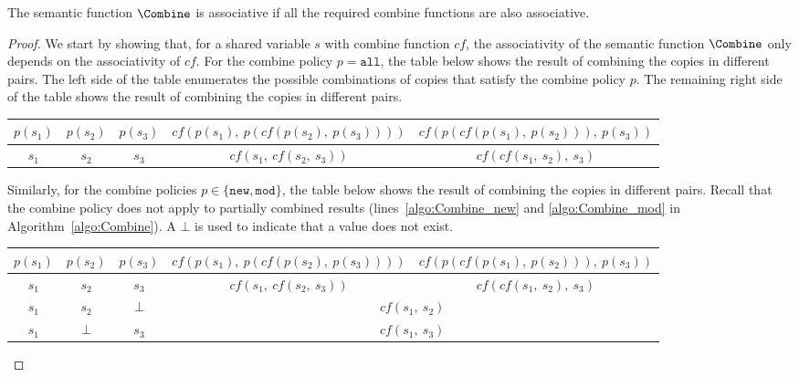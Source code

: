 \begin{theorem}
	\label{thm:associative_combine}
	The semantic function $\Combine$ is associative if all the 
	required combine functions are also associative.
\end{theorem}
\begin{proof}
	We start by showing that, for a shared variable $s$ with 
	combine function $cf$, the associativity of the semantic function 
	$\Combine$ only depends on the associativity of $cf$. For the 
	combine policy $p = \mathtt{all}$, the table below shows the 
	result of combining the copies in different pairs. The 
	left side of the table enumerates the possible combinations of 
	copies that satisfy the combine policy $p$. The remaining right 
	side of the table shows the result of combining the copies in
	different pairs.
	\begin{center}
		\begin{tabular}{| c c c || c | c |}
			\hline
			\boldmath$p(s_1)$	& \boldmath$p(s_2)$	&\boldmath$p(s_3)$	& \boldmath$cf(p(s_1),~p(cf(p(s_2),~p(s_3))))$	& \boldmath$cf(p(cf(p(s_1),~p(s_2))),~p(s_3))$	\\ 
			\hline
			$s_1$				& $s_2$				& $s_3$				& $cf(s_1,~cf(s_2,~s_3))$						& $cf(cf(s_1,~s_2),~s_3)$						\\
			\hline
		\end{tabular}
	\end{center}
	Similarly, for the combine policies $p \in \{\mathtt{new}, \mathtt{mod}\}$, the 
	table below shows the result of combining the copies in 
	different pairs. Recall that the combine policy does not apply to 
	partially combined results (lines~\ref{algo:Combine_new} and 
	\ref{algo:Combine_mod} in Algorithm~\ref{algo:Combine}). 
	A $\bot$ is used to indicate that a value does not exist.
	\begin{center}
		\begin{tabular}{| c c c || c | c |}
			\hline
			\boldmath$p(s_1)$	& \boldmath$p(s_2)$	&\boldmath$p(s_3)$	& \boldmath$cf(p(s_1),~p(cf(p(s_2),~p(s_3))))$	& \boldmath$cf(p(cf(p(s_1),~p(s_2))),~p(s_3))$	\\ 
			\hline
			$s_1$				& $s_2$				& $s_3$				& $cf(s_1,~cf(s_2,~s_3))$						& $cf(cf(s_1,~s_2),~s_3)$						\\ \hline
			$s_1$				& $s_2$				& $\bot$			& \multicolumn{2}{c|}{$cf(s_1,~s_2)$}															\\ \hline
			$s_1$				& $\bot$			& $s_3$				& \multicolumn{2}{c|}{$cf(s_1,~s_3)$}															\\ \hline

\end{tabular}
\end{center}
\end{proof}
